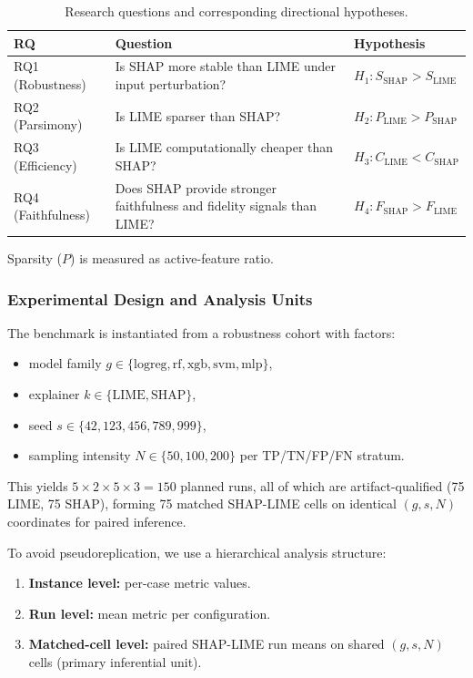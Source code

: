 \documentclass[10pt,a4paper,twoside]{article}
\begin{document}
\begin{table}[h]
\centering
\caption{Research questions and corresponding directional hypotheses.}
\label{tab:rqs}
\begin{tabularx}{\linewidth}{p{2.1cm} X l}
\toprule
\textbf{RQ} & \textbf{Question} & \textbf{Hypothesis} \\
\midrule
RQ1 (Robustness) & Is SHAP more stable than LIME under input perturbation? & $H_1: S_{\mathrm{SHAP}} > S_{\mathrm{LIME}}$ \\
RQ2 (Parsimony) & Is LIME sparser than SHAP? & $H_2: P_{\mathrm{LIME}} > P_{\mathrm{SHAP}}$ \\
RQ3 (Efficiency) & Is LIME computationally cheaper than SHAP? & $H_3: C_{\mathrm{LIME}} < C_{\mathrm{SHAP}}$ \\
RQ4 (Faithfulness) & Does SHAP provide stronger faithfulness and fidelity signals than LIME? & $H_4: F_{\mathrm{SHAP}} > F_{\mathrm{LIME}}$ \\
\bottomrule
\end{tabularx}
\end{table}
Sparsity ($P$) is measured as active-feature ratio.

\subsubsection{Experimental Design and Analysis Units}
\label{sec:design}

The benchmark is instantiated from a robustness cohort with factors:
\begin{itemize}[leftmargin=*]
\item model family $g \in \{\mathrm{logreg}, \mathrm{rf}, \mathrm{xgb},
\mathrm{svm}, \mathrm{mlp}\}$,
\item explainer $k \in \{\mathrm{LIME}, \mathrm{SHAP}\}$,
\item seed $s \in \{42, 123, 456, 789, 999\}$,
\item sampling intensity $N \in \{50, 100, 200\}$ per TP/TN/FP/FN stratum.
\end{itemize}

This yields $5 \times 2 \times 5 \times 3 = 150$ planned runs, all of
which are artifact-qualified (75 LIME, 75 SHAP), forming 75 matched
SHAP-LIME cells on identical $(g, s, N)$ coordinates for paired inference.

To avoid pseudoreplication, we use a hierarchical analysis structure:
\begin{enumerate}[leftmargin=*]
\item \textbf{Instance level:} per-case metric values.
\item \textbf{Run level:} mean metric per configuration.
\item \textbf{Matched-cell level:} paired SHAP-LIME run means on shared
$(g, s, N)$ cells (primary inferential unit).
\end{enumerate}
\end{document}
